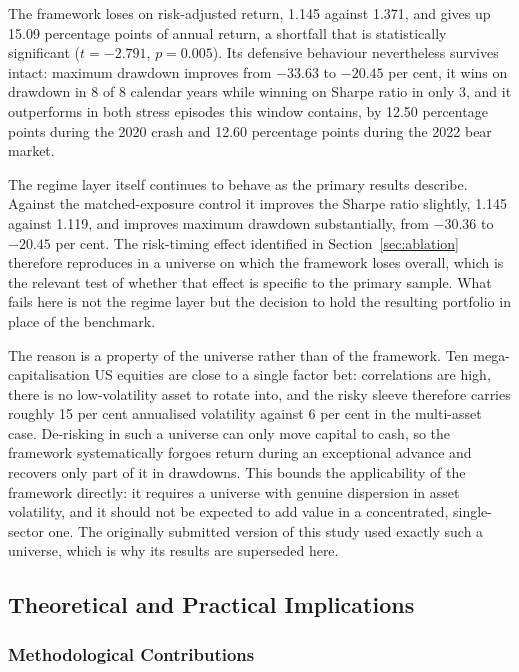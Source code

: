 \documentclass{singlecol-new}
\theoremstyle{TH}{
\newtheorem{lemma}{Lemma}
\newtheorem{theorem}[lemma]{Theorem}
\newtheorem{corrolary}[lemma]{Corrolary}
\newtheorem{conjecture}[lemma]{Conjecture}
\newtheorem{proposition}[lemma]{Proposition}
\newtheorem{claim}[lemma]{Claim}
\newtheorem{stheorem}[lemma]{Wrong Theorem}
\newtheorem{algorithm}{Algorithm}
}
\theoremstyle{THrm}{
\newtheorem{definition}{Definition}[section]
\newtheorem{question}{Question}[section]
\newtheorem{remark}{Remark}
\newtheorem{scheme}{Scheme}
}
\theoremstyle{THhit}{
\newtheorem{case}{Case}[section]
}
\begin{document}
The framework loses on risk-adjusted return, 1.145 against 1.371, and gives up 15.09
percentage points of annual return, a shortfall that is statistically significant
($t = -2.791$, $p = 0.005$). Its defensive behaviour nevertheless survives intact:
maximum drawdown improves from $-33.63$ to $-20.45$ per cent, it wins on drawdown in 8 of
8 calendar years while winning on Sharpe ratio in only 3, and it outperforms in both
stress episodes this window contains, by 12.50 percentage points during the 2020 crash
and 12.60 percentage points during the 2022 bear market.

The regime layer itself continues to behave as the primary results describe. Against the
matched-exposure control it improves the Sharpe ratio slightly, 1.145 against 1.119, and
improves maximum drawdown substantially, from $-30.36$ to $-20.45$ per cent. The
risk-timing effect identified in Section~\ref{sec:ablation} therefore reproduces in a
universe on which the framework loses overall, which is the relevant test of whether that
effect is specific to the primary sample. What fails here is not the regime layer but the
decision to hold the resulting portfolio in place of the benchmark.

The reason is a property of the universe rather than of the framework. Ten
mega-capitalisation US equities are close to a single factor bet: correlations are high,
there is no low-volatility asset to rotate into, and the risky sleeve therefore carries
roughly 15 per cent annualised volatility against 6 per cent in the multi-asset case.
De-risking in such a universe can only move capital to cash, so the framework
systematically forgoes return during an exceptional advance and recovers only part of it
in drawdowns. This bounds the applicability of the framework directly: it requires a
universe with genuine dispersion in asset volatility, and it should not be expected to
add value in a concentrated, single-sector one. The originally submitted version of this
study used exactly such a universe, which is why its results are superseded here.

\subsection{Theoretical and Practical Implications}

\subsubsection{Methodological Contributions}
\end{document}
